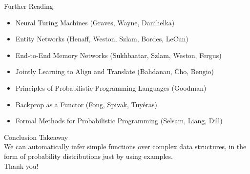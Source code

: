 \documentclass{beamer}
\begin{document}
\begin{frame}{Further Reading}
	\begin{itemize}
	\item \alert{Neural Turing Machines} (Graves, Wayne, Danihelka)
	\item \alert{Entity Networks} (Henaff, Weston, Szlam, Bordes, LeCun)
	\item \alert{End-to-End Memory Networks} (Sukhbaatar, Szlam, Weston, Fergus)	
	\item \alert{Jointly Learning to Align and Translate} (Bahdanau, Cho, Bengio)
	\item \alert{Principles of Probabilistic Programming Languages} (Goodman)
	\item \alert{Backprop as a Functor} (Fong, Spivak, Tuyéras)
	\item \alert{Formal Methods for Probabilistic Programming} (Selsam, Liang, Dill)
	\end{itemize}
\end{frame}

\begin{frame}{Conclusion}
	\alert{Takeaway}\\
	We can automatically infer simple functions over complex data structures, in the form of \alert{probability distributions} just by using examples.\\
		
	\pause
	\center	\alert{Thank you!}
\end{frame}
\end{document}
